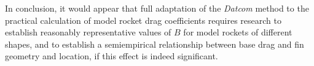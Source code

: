 In conclusion, it would appear that full adaptation of the \emph{Datcom} method to the practical
calculation of model rocket drag coefficients requires research to establish reasonably
representative values of $B$ for model rockets of different shapes, and to establish a
semiempirical relationship between base drag and fin geometry and location, if this effect is
indeed significant.
